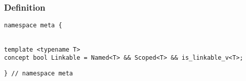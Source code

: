 
\subsubsection{Definition}

\begin{verbatim}
namespace meta {
\end{verbatim}
\begin{verbatim}

template <typename T>
concept bool Linkable = Named<T> && Scoped<T> && is_linkable_v<T>;

\end{verbatim}
\begin{verbatim}
} // namespace meta
\end{verbatim}
